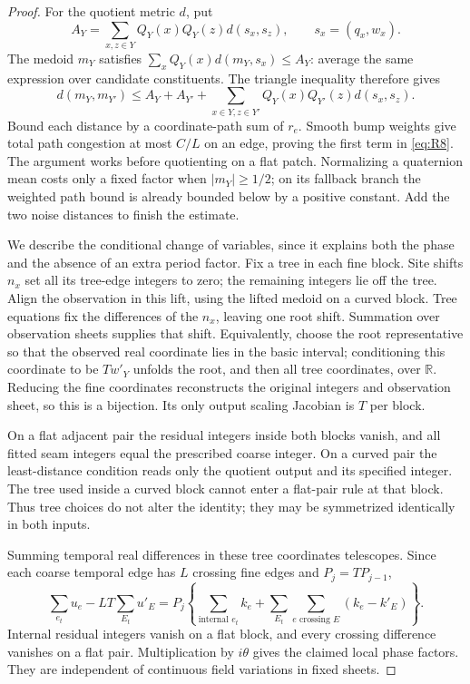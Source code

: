 \begin{proof}
For the quotient metric $d$, put
\[
 A_Y=\sum_{x,z\in Y}Q_Y(x)Q_Y(z)d(s_x,s_z),
 \qquad s_x=(q_x,w_x).
\]
The medoid $m_Y$ satisfies
$\sum_xQ_Y(x)d(m_Y,s_x)\le A_Y$: average the same expression over
candidate constituents.  The triangle inequality therefore gives
\[
 d(m_Y,m_{Y'})\le A_Y+A_{Y'}+
       \sum_{x\in Y,z\in Y'}Q_Y(x)Q_{Y'}(z)d(s_x,s_z).
\]
Bound each distance by a coordinate-path sum of $r_e$.  Smooth bump
weights give total path congestion at most $C/L$ on an edge, proving
the first term in \eqref{eq:R8}.  The argument works before quotienting
on a flat patch.  Normalizing a quaternion mean costs only a fixed
factor when $|m_Y|\ge1/2$; on its fallback branch the weighted path
bound is already bounded below by a positive constant.  Add the two
noise distances to finish the estimate.

We describe the conditional change of variables, since it explains both
the phase and the absence of an extra period factor.  Fix a tree in
each fine block.  Site shifts $n_x$ set all its tree-edge integers to
zero; the remaining integers lie off the tree.  Align the observation
in this lift, using the lifted medoid on a curved block.  Tree equations
fix the differences of the $n_x$, leaving one root shift.  Summation over
observation sheets supplies that shift.  Equivalently, choose the root
representative so that the observed real coordinate lies in the basic
interval; conditioning this coordinate to be $Tw'_Y$ unfolds the root,
and then all tree coordinates, over $\mathbb R$.  Reducing the fine
coordinates reconstructs the original integers and observation sheet,
so this is a bijection.  Its only output scaling Jacobian is $T$ per
block.

On a flat adjacent pair the residual integers inside both blocks vanish,
and all fitted seam integers equal the prescribed coarse integer.
On a curved pair the least-distance condition reads only the quotient
output and its specified integer.  The tree used inside a curved block
cannot enter a flat-pair rule at that block.  Thus tree choices do not
alter the identity; they may be symmetrized identically in both inputs.

Summing temporal real differences in these tree coordinates telescopes.
Since each coarse temporal edge has $L$ crossing fine edges and
$P_j=TP_{j-1}$,
\[
 \sum_{e_t}u_e-LT\sum_{E_t}u'_E
   =P_j\left\{\sum_{\text{internal }e_t}k_e+
       \sum_{E_t}\sum_{e\text{ crossing }E}(k_e-k'_E)\right\}.
\]
Internal residual integers vanish on a flat block, and every crossing
difference vanishes on a flat pair.  Multiplication by $i\theta$ gives
the claimed local phase factors.  They are independent of continuous
field variations in fixed sheets.
\end{proof}

